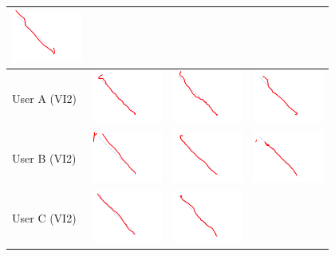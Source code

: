 \begin{tabular}{lccc}
\includegraphics[width=2.3cm]{../experiments/line_Angus_2.png} \\
\midrule
 User A (VI2)&
\includegraphics[width=2.3cm]{../experiments/line_Ayaka_p_0.png} &
\includegraphics[width=2.3cm]{../experiments/line_Ayaka_p_1.png} &
\includegraphics[width=2.3cm]{../experiments/line_Ayaka_p_2.png} \\
\midrule
 User B (VI2)&
\includegraphics[width=2.3cm]{../experiments/line_Takeyo_p_0.png} &
\includegraphics[width=2.3cm]{../experiments/line_Takeyo_p_1.png} &
\includegraphics[width=2.3cm]{../experiments/line_Takeyo_p_2.png} \\
\midrule
 User C (VI2)&
\includegraphics[width=2.3cm]{../experiments/line_Angus_p_0.png} &
\includegraphics[width=2.3cm]{../experiments/line_Angus_p_1.png} &

\end{tabular}
